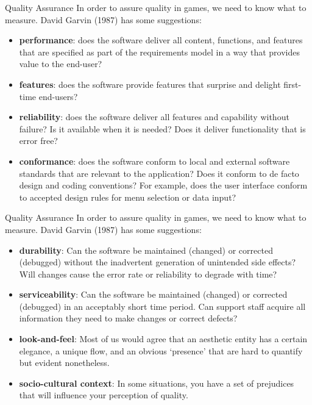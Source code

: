 \begin{frame}[fragile]{Quality Assurance}
	In order to assure quality in games, we need to know what to measure. David Garvin (1987) has some suggestions:

	\begin{itemize}
		\item \textbf{performance}: does the software deliver all content, functions, and features that are specified as part of the
		 requirements model in a way that provides value to the end-user?
		\item \textbf{features}: does the software provide features that surprise and delight first-time end-users?
		\item \textbf{reliability}: does the software deliver all features and capability without failure? Is it available when it is needed? 
		 Does it deliver functionality that is error free?
		\item \textbf{conformance}: does the software conform to local and external software standards that are relevant to the 
		application? Does it conform to de facto design and coding conventions? For example, does the user interface conform to accepted 
		design rules for menu selection or data input?
	\end{itemize}
\end{frame}

\begin{frame}[fragile]{Quality Assurance}
	In order to assure quality in games, we need to know what to measure. David Garvin (1987) has some suggestions:

	\begin{itemize}
		\item \textbf{durability}: Can the software be maintained (changed) or corrected (debugged) without the inadvertent generation 
		of unintended side effects? Will changes cause the error rate or reliability to degrade with time? 
		\item \textbf{serviceability}: Can the software be maintained (changed) or corrected (debugged) in an acceptably short time period. 
		Can support staff acquire all information they need to make changes or correct defects? 
		\item \textbf{look-and-feel}: Most of us would agree that an aesthetic entity has a certain elegance, a unique flow, and an obvious 
		`presence' that are hard to quantify but evident nonetheless. 
		\item \textbf{socio-cultural context}: In some situations, you have a set of prejudices that will influence your perception of quality. 
	\end{itemize}
\end{frame}

